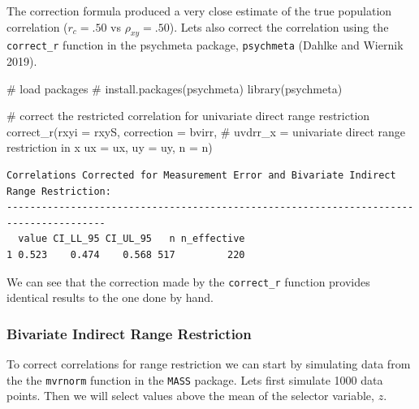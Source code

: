\documentclass[
  letterpaper,
  DIV=11,
  numbers=noendperiod]{scrreprt}
\newenvironment{Shaded}{\begin{snugshade}}{\end{snugshade}}
\newcommand{\AttributeTok}[1]{\textcolor[rgb]{0.40,0.45,0.13}{#1}}
\newcommand{\CommentTok}[1]{\textcolor[rgb]{0.37,0.37,0.37}{#1}}
\newcommand{\FunctionTok}[1]{\textcolor[rgb]{0.28,0.35,0.67}{#1}}
\newcommand{\NormalTok}[1]{\textcolor[rgb]{0.00,0.23,0.31}{#1}}
\newcommand{\StringTok}[1]{\textcolor[rgb]{0.13,0.47,0.30}{#1}}
\begin{document}
The correction formula produced a very close estimate of the true
population correlation (\(r_c = .50\) vs \(\rho_{xy}=.50\)). Lets also
correct the correlation using the \texttt{correct\_r} function in the
psychmeta package, \texttt{psychmeta} (Dahlke and Wiernik 2019).

\begin{Shaded}
\begin{Highlighting}[]
\CommentTok{\# load packages}
\CommentTok{\# install.packages(\textquotesingle{}psychmeta\textquotesingle{})}
\FunctionTok{library}\NormalTok{(psychmeta)}

\CommentTok{\# correct the restricted correlation for univariate direct range restriction}
\FunctionTok{correct\_r}\NormalTok{(}\AttributeTok{rxyi =}\NormalTok{ rxyS,}
          \AttributeTok{correction =} \StringTok{\textquotesingle{}bvirr\textquotesingle{}}\NormalTok{,  }\CommentTok{\# uvdrr\_x = univariate direct range restriction in x}
          \AttributeTok{ux =}\NormalTok{ ux,}
          \AttributeTok{uy =}\NormalTok{ uy,}
          \AttributeTok{n =}\NormalTok{ n)}
\end{Highlighting}
\end{Shaded}

\begin{verbatim}
Correlations Corrected for Measurement Error and Bivariate Indirect Range Restriction:
---------------------------------------------------------------------------------------
  value CI_LL_95 CI_UL_95   n n_effective
1 0.523    0.474    0.568 517         220
\end{verbatim}

We can see that the correction made by the \texttt{correct\_r} function
provides identical results to the one done by hand.

\hypertarget{bivariate-indirect-range-restriction}{%
\subsubsection*{Bivariate Indirect Range
Restriction}\label{bivariate-indirect-range-restriction}}

To correct correlations for range restriction we can start by simulating
data from the the \texttt{mvrnorm} function in the \texttt{MASS}
package. Lets first simulate 1000 data points. Then we will select
values above the mean of the selector variable, \(z\).
\end{document}
